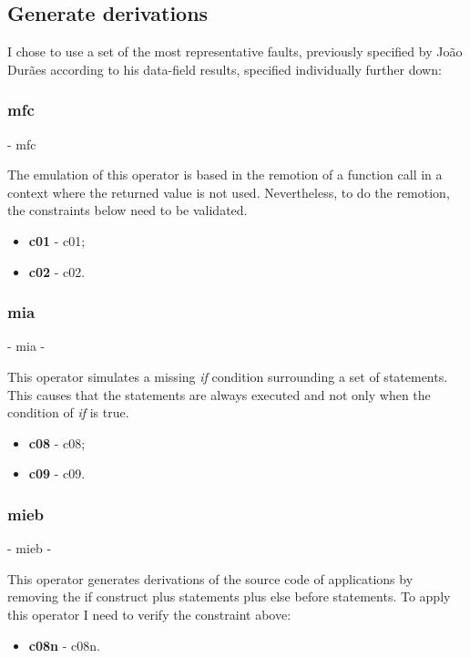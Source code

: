 \clearpage
\subsection{Generate derivations}

I chose to use a set of the most representative faults, previously specified by João Durães\cite{duraes2006emulation} according to his data-field results, specified individually further down:

	\subsubsection{\textbf{\acs{mfc}}} - \Acl{mfc}

	The emulation of this operator is based in the remotion of a function call in a context where the returned value is not used. Nevertheless, to do the remotion, the constraints below need to be validated.
	\begin{itemize}
		\item \textbf{\acs{c01}} - \Acl{c01};
		\item \textbf{\acs{c02}} - \Acl{c02}.
	\end{itemize}

	\subsubsection{\textbf{\acs{mia}}} - \Acl{mia} - 

	This operator simulates a missing \textit{if} condition surrounding a set of statements. This causes that the statements are always executed and not only when the condition of \textit{if} is true.
	\begin{itemize}
		\item \textbf{\acs{c08}} - \Acl{c08};
		\item \textbf{\acs{c09}} - \Acl{c09}.
	\end{itemize}

	\subsubsection{\textbf{\acs{mieb}}} - \Acl{mieb} - 

	This operator generates derivations of the source code of applications by removing the if construct plus statements plus else before statements. To apply this operator I need to verify the constraint above:
	\begin{itemize}
		\item \textbf{\acs{c08n}} - \Acl{c08n}.
	\end{itemize}

